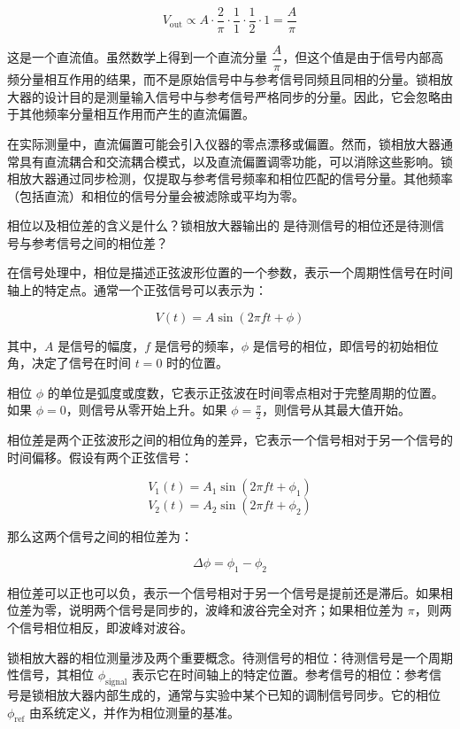 \documentclass[dvipsnames, svgnames,a4paper,11pt]{article}
\begin{document}
\[
V_{\text{out}} \propto A \cdot \dfrac{2}{\pi} \cdot \dfrac{1}{1} \cdot \dfrac{1}{2} \cdot 1 = \dfrac{A}{\pi}
\]

这是一个直流值。虽然数学上得到一个直流分量 \( \dfrac{A}{\pi} \)，但这个值是由于信号内部高频分量相互作用的结果，而不是原始信号中与参考信号同频且同相的分量。锁相放大器的设计目的是测量输入信号中与参考信号严格同步的分量。因此，它会忽略由于其他频率分量相互作用而产生的直流偏置。

在实际测量中，直流偏置可能会引入仪器的零点漂移或偏置。然而，锁相放大器通常具有直流耦合和交流耦合模式，以及直流偏置调零功能，可以消除这些影响。锁相放大器通过同步检测，仅提取与参考信号频率和相位匹配的信号分量。其他频率（包括直流）和相位的信号分量会被滤除或平均为零。




\begin{question}
	相位以及相位差的含义是什么？锁相放大器输出的是待测信号的相位还是待测信号与参考信号之间的相位差？
\end{question}

在信号处理中，相位是描述正弦波形位置的一个参数，表示一个周期性信号在时间轴上的特定点。通常一个正弦信号可以表示为：

\[
V(t) = A \sin(2\pi f t + \phi)
\]

其中，\( A \) 是信号的幅度，\( f \) 是信号的频率，\( \phi \) 是信号的相位，即信号的初始相位角，决定了信号在时间 \( t = 0 \) 时的位置。

相位 \( \phi \) 的单位是弧度或度数，它表示正弦波在时间零点相对于完整周期的位置。如果 \( \phi = 0 \)，则信号从零开始上升。如果 \( \phi = \frac{\pi}{2} \)，则信号从其最大值开始。

相位差是两个正弦波形之间的相位角的差异，它表示一个信号相对于另一个信号的时间偏移。假设有两个正弦信号：

\[
V_1(t) = A_1 \sin(2\pi f t + \phi_1)
\]
\[
V_2(t) = A_2 \sin(2\pi f t + \phi_2)
\]

那么这两个信号之间的相位差为：

\[
\Delta \phi = \phi_1 - \phi_2
\]

相位差可以正也可以负，表示一个信号相对于另一个信号是提前还是滞后。如果相位差为零，说明两个信号是同步的，波峰和波谷完全对齐；如果相位差为 \( \pi \)，则两个信号相位相反，即波峰对波谷。

锁相放大器的相位测量涉及两个重要概念。待测信号的相位：待测信号是一个周期性信号，其相位 \( \phi_{\text{signal}} \) 表示它在时间轴上的特定位置。参考信号的相位：参考信号是锁相放大器内部生成的，通常与实验中某个已知的调制信号同步。它的相位 \( \phi_{\text{ref}} \) 由系统定义，并作为相位测量的基准。
\end{document}
